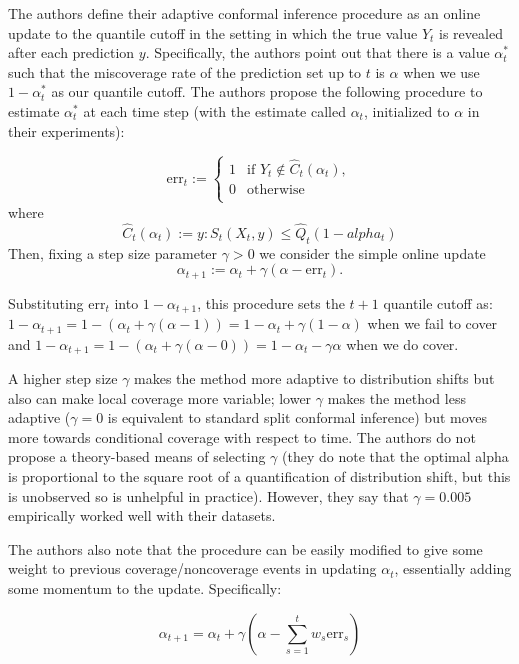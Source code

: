 \documentclass[
]{article}
\begin{document}
The authors define their adaptive conformal inference procedure as an
online update to the quantile cutoff in the setting in which the true
value \(Y_t\) is revealed after each prediction \(y\). Specifically, the
authors point out that there is a value \(\alpha^*_t\) such that the
miscoverage rate of the prediction set up to \(t\) is \(\alpha\) when we
use \(1-\alpha^*_t\) as our quantile cutoff. The authors propose the
following procedure to estimate \(\alpha^*_t\) at each time step (with
the estimate called \(\alpha_t\), initialized to \(\alpha\) in their
experiments):

\[ \textrm{err}_t := 
\left \{
\begin{array}{ll}
1 & \textrm{if } Y_t \notin \hat{C}_t(\alpha_t), \\
0 & \textrm{otherwise} \\
\end{array} 
\right. 
\] where
\[ \hat{C}_t (\alpha_t) := {y : S_t(X_t, y) \le \hat{Q}_t(1 - alpha_t)} \]
Then, fixing a step size parameter \(\gamma > 0\) we consider the simple
online update
\[ \alpha_{t+1} := \alpha_t + \gamma(\alpha - \textrm{err}_t). \]

Substituting \(\textrm{err}_t\) into \(1-\alpha_{t+1}\), this procedure
sets the \(t+1\) quantile cutoff as:
\(1-\alpha_{t+1} = 1- (\alpha_t + \gamma(\alpha-1)) = 1 - \alpha_t + \gamma(1-\alpha)\)
when we fail to cover and
\(1-\alpha_{t+1} = 1- (\alpha_t + \gamma(\alpha-0)) = 1 - \alpha_t - \gamma\alpha\)
when we do cover.

A higher step size \(\gamma\) makes the method more adaptive to
distribution shifts but also can make local coverage more variable;
lower \(\gamma\) makes the method less adaptive (\(\gamma=0\) is
equivalent to standard split conformal inference) but moves more towards
conditional coverage with respect to time. The authors do not propose a
theory-based means of selecting \(\gamma\) (they do note that the
optimal alpha is proportional to the square root of a quantification of
distribution shift, but this is unobserved so is unhelpful in practice).
However, they say that \(\gamma=0.005\) empirically worked well with
their datasets.

The authors also note that the procedure can be easily modified to give
some weight to previous coverage/noncoverage events in updating
\(\alpha_t\), essentially adding some momentum to the update.
Specifically:

\[ \alpha_{t + 1} = \alpha_t + \gamma(\alpha - \sum_{s=1}^t w_s \textrm{err}_s) \]
\end{document}
